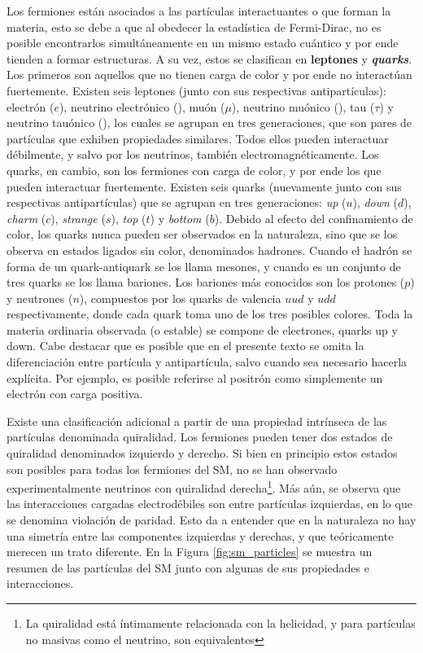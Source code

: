 Los fermiones están asociados a las partículas interactuantes o que forman la materia,
esto se debe a que al obedecer la estadística de Fermi-Dirac, no es posible encontrarlos simultáneamente en un mismo estado cuántico y por ende tienden a formar estructuras. A su vez, estos se clasifican en \textbf{leptones} y \textbf{\textit{quarks}}. Los primeros son aquellos que no tienen carga de color y por ende no interactúan fuertemente. Existen seis leptones (junto con sus respectivas antipartículas): electrón ($e$), neutrino electrónico (\nue), muón ($\mu$), neutrino muónico (\numu), tau ($\tau$) y neutrino tauónico (\nutau), los cuales se agrupan en tres generaciones, que son pares de partículas que exhiben propiedades similares. Todos ellos pueden interactuar débilmente, y salvo por los neutrinos, también electromagnéticamente. Los quarks, en cambio, son los fermiones con carga de color, y por ende los que pueden interactuar fuertemente. Existen seis quarks (nuevamente junto con sus respectivas antipartículas) que se agrupan en tres generaciones: \textit{up} ($u$), \textit{down} ($d$), \textit{charm} ($c$), \textit{strange} ($s$), \textit{top} ($t$) y \textit{bottom} ($b$). Debido al efecto del confinamiento de color, los quarks nunca pueden ser observados en la naturaleza, sino que se los observa en estados ligados sin color, denominados hadrones. Cuando el hadrón se forma de un quark-antiquark se los llama mesones, y cuando es un conjunto de tres quarks se los llama bariones. Los bariones más conocidos son los protones ($p$) y neutrones ($n$), compuestos por los quarks de valencia $uud$ y $udd$ respectivamente, donde cada quark toma uno de los tres posibles colores. Toda la materia ordinaria observada (o estable) se compone de electrones, quarks up y down. Cabe destacar que es posible que en el presente texto se omita la diferenciación entre partícula y antipartícula, salvo cuando sea necesario hacerla explícita. Por ejemplo, es posible referirse al positrón como simplemente un electrón con carga positiva.

Existe una clasificación adicional a partir de una propiedad intrínseca de las partículas denominada quiralidad. 
Los fermiones pueden tener dos estados de quiralidad denominados izquierdo y derecho. Si bien en principio estos estados son posibles para todas los fermiones del SM, no se han observado experimentalmente neutrinos con quiralidad derecha\footnote{La quiralidad está íntimamente relacionada con la helicidad, y para partículas no masivas como el neutrino, son equivalentes}. Más aún, se observa que las interacciones cargadas electrodébiles son entre partículas izquierdas, 
en lo que se denomina violación de paridad. Esto da a entender que en la naturaleza no hay una simetría entre las componentes izquierdas y derechas, y que teóricamente merecen un trato diferente.
En la Figura \ref{fig:sm_particles} se muestra un resumen de las partículas del SM junto con algunas de sus propiedades e interacciones.





